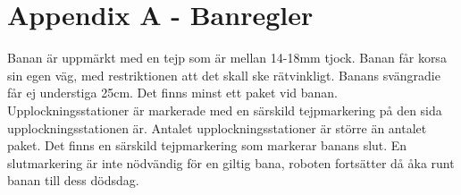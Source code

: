 \section{Appendix A - Banregler}

Banan är uppmärkt med en tejp som är mellan 14-18mm tjock. Banan får korsa sin egen väg, med restriktionen att det skall ske rätvinkligt. Banans svängradie får ej understiga 25cm.
Det finns minst ett paket vid banan.
Upplockningsstationer är markerade med en särskild tejpmarkering på den sida upplockningsstationen är. Antalet upplockningsstationer är större än antalet paket.
Det finns en särskild tejpmarkering som markerar banans slut. En slutmarkering är inte nödvändig för en giltig bana, roboten fortsätter då åka runt banan till dess dödsdag.
